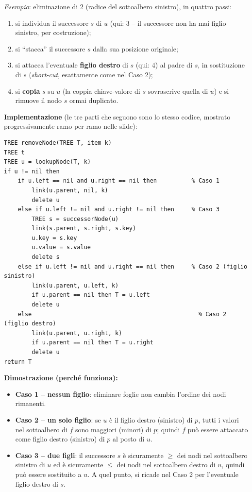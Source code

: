 \documentclass[12pt, a4paper]{article}
\begin{document}
\begin{tcolorbox}[colback=lightergray!5, colframe=tocsubsec, title=\textbf{Caso 3: $u$ ha due Figli}]
\textit{Esempio}: eliminazione di $2$ (radice del sottoalbero sinistro), in quattro passi:
\begin{enumerate}
    \item si individua il successore $s$ di $u$ (qui: $3$ -- il successore non ha mai figlio sinistro, per costruzione);
    \item si ``stacca'' il successore $s$ dalla sua posizione originale;
    \item si attacca l'eventuale \textbf{figlio destro} di $s$ (qui: $4$) al padre di $s$, in sostituzione di $s$ (\textit{short-cut}, esattamente come nel Caso 2);
    \item si \textbf{copia} $s$ su $u$ (la coppia chiave-valore di $s$ sovrascrive quella di $u$) e si rimuove il nodo $s$ ormai duplicato.
\end{enumerate}
\end{tcolorbox}

\textbf{Implementazione} (le tre parti che seguono sono lo stesso codice, mostrato progressivamente ramo per ramo nelle slide):
\begin{verbatim}
TREE removeNode(TREE T, item k)
TREE t
TREE u = lookupNode(T, k)
if u != nil then
    if u.left == nil and u.right == nil then          % Caso 1
        link(u.parent, nil, k)
        delete u
    else if u.left != nil and u.right != nil then     % Caso 3
        TREE s = successorNode(u)
        link(s.parent, s.right, s.key)
        u.key = s.key
        u.value = s.value
        delete s
    else if u.left != nil and u.right == nil then     % Caso 2 (figlio sinistro)
        link(u.parent, u.left, k)
        if u.parent == nil then T = u.left
        delete u
    else                                                % Caso 2 (figlio destro)
        link(u.parent, u.right, k)
        if u.parent == nil then T = u.right
        delete u
return T
\end{verbatim}

\textbf{Dimostrazione (perché funziona):}
\begin{itemize}
    \item \textbf{Caso 1 -- nessun figlio}: eliminare foglie non cambia l'ordine dei nodi rimanenti.
    \item \textbf{Caso 2 -- un solo figlio}: se $u$ è il figlio destro (sinistro) di $p$, tutti i valori nel sottoalbero di $f$ sono maggiori (minori) di $p$; quindi $f$ può essere attaccato come figlio destro (sinistro) di $p$ al posto di $u$.
    \item \textbf{Caso 3 -- due figli}: il successore $s$ è sicuramente $\ge$ dei nodi nel sottoalbero sinistro di $u$ ed è sicuramente $\le$ dei nodi nel sottoalbero destro di $u$, quindi può essere sostituito a $u$. A quel punto, si ricade nel Caso 2 per l'eventuale figlio destro di $s$.
\end{itemize}
\end{document}
